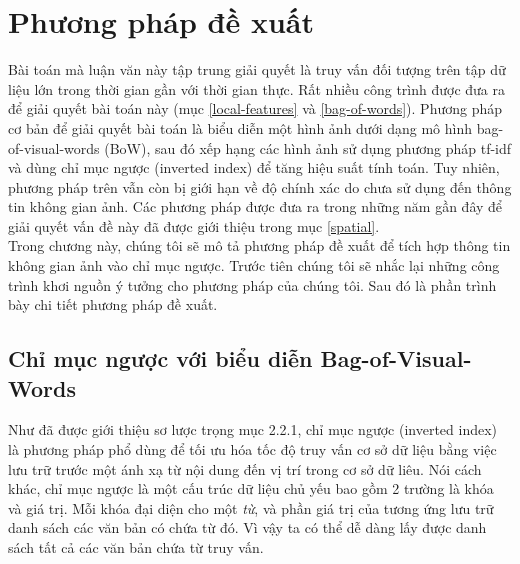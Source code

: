 \chapter{Phương pháp đề xuất}
\ifpdf
    \graphicspath{{Chapter3/Chapter3Figs/PNG/}{Chapter3/Chapter3Figs/PDF/}{Chapter3/Chapter3Figs/}}
\else
    \graphicspath{{Chapter3/Chapter3Figs/EPS/}{Chapter3/Chapter3Figs/}}
\fi


Bài toán mà luận văn này tập trung giải quyết là truy vấn đối tượng trên tập dữ liệu lớn trong thời gian gần với thời gian thực. Rất nhiều công trình được đưa ra để giải quyết bài toán này (mục \ref{local-features} và \ref{bag-of-words}). Phương pháp cơ bản để giải quyết bài toán là biểu diễn một hình ảnh dưới dạng mô hình bag-of-visual-words (BoW), sau đó xếp hạng các hình ảnh sử dụng phương pháp tf-idf và dùng chỉ mục ngược (inverted index) để tăng hiệu suất tính toán. Tuy nhiên, phương pháp trên vẫn còn bị giới hạn về độ chính xác do chưa sử dụng đến thông tin không gian ảnh. Các phương pháp được đưa ra trong những năm gần đây để giải quyết vấn đề này đã được giới thiệu trong mục \ref{spatial}.\\

Trong chương này, chúng tôi sẽ mô tả phương pháp đề xuất để tích hợp thông tin không gian ảnh vào chỉ mục ngược. Trước tiên chúng tôi sẽ nhắc lại những công trình khơi nguồn ý tưởng cho phương pháp của chúng tôi. Sau đó là phần trình bày chi tiết phương pháp đề xuất.

\section{Chỉ mục ngược với biểu diễn Bag-of-Visual-Words}
Như đã được giới thiệu sơ lược trọng mục 2.2.1, chỉ mục ngược (inverted index) là phương pháp phổ dùng để tối ưu hóa tốc độ truy vấn cơ sở dữ liệu bằng việc lưu trữ trước một ánh xạ từ nội dung đến vị trí trong cơ sở dữ liêu. Nói cách khác, chỉ mục ngược là một cấu trúc dữ liệu chủ yếu bao gồm 2 trường là khóa và giá trị. Mỗi khóa đại diện cho một \textit{từ}, và phần giá trị của tương ứng lưu trữ danh sách các văn bản có chứa từ đó. Vì vậy ta có thể dễ dàng lấy được danh sách tất cả các văn bản chứa từ truy vấn.

